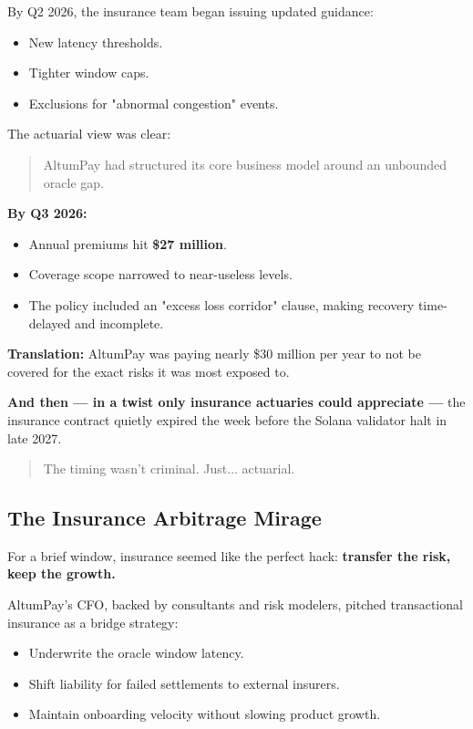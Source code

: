 By Q2 2026, the insurance team began issuing updated guidance:
\begin{itemize}
\item New latency thresholds.
\item Tighter window caps.
\item Exclusions for "abnormal congestion" events.
\end{itemize}

The actuarial view was clear:

\begin{quote}
AltumPay had structured its core business model around an unbounded oracle gap.
\end{quote}

\textbf{By Q3 2026:}
\begin{itemize}
\item Annual premiums hit \textbf{\$27 million}.
\item Coverage scope narrowed to near-useless levels.
\item The policy included an "excess loss corridor" clause, making recovery time-delayed and incomplete.
\end{itemize}

\textbf{Translation:} AltumPay was paying nearly \$30 million per year to not be covered for the exact risks it was most exposed to.

\medskip

\textbf{And then --- in a twist only insurance actuaries could appreciate ---}
the insurance contract quietly expired the week before the Solana validator halt in late 2027.

\begin{quote}
The timing wasn’t criminal. Just... actuarial.
\end{quote}

\subsection{The Insurance Arbitrage Mirage}

For a brief window, insurance seemed like the perfect hack:  
\textbf{transfer the risk, keep the growth.}

\medskip

AltumPay’s CFO, backed by consultants and risk modelers, pitched transactional insurance as a bridge strategy:

\begin{itemize}
    \item Underwrite the oracle window latency.
    \item Shift liability for failed settlements to external insurers.
    \item Maintain onboarding velocity without slowing product growth.
\end{itemize}

